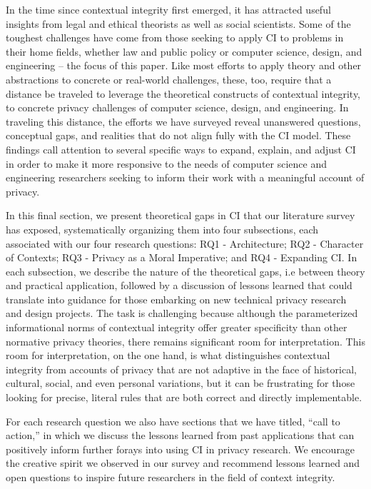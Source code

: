 \documentclass[../thesis.tex]{subfiles}
\begin{document}
In the time since contextual integrity
first emerged, it has attracted useful insights from legal and ethical
theorists as well as social scientists. Some of the toughest challenges
have come from those seeking to apply CI to problems in their home
fields, whether law and public policy or computer science, design, and
engineering -- the focus of this paper. Like most efforts to apply
theory and other abstractions to concrete or real-world challenges,
these, too, require that a distance be traveled to leverage the
theoretical constructs of contextual integrity, to concrete privacy
challenges of computer science, design, and engineering. In traveling
this distance, the efforts we have surveyed reveal unanswered
questions, conceptual gaps, and realities that do not align fully with
the CI model. These findings call attention to several specific ways to
expand, explain, and adjust CI in order to make it more responsive to
the needs of computer science and engineering researchers seeking to
inform their work with a meaningful account of privacy. 

In this final section, we present
theoretical gaps in CI
that our literature survey has exposed,
systematically organizing them into four subsections, each associated
with our four research questions: RQ1 - Architecture; RQ2 - Character
of Contexts; RQ3 - Privacy as a Moral Imperative; and RQ4 - Expanding
CI. In each subsection, we describe the nature of the theoretical gaps,
i.e between theory and practical application, followed by a discussion
of lessons learned that could translate into guidance for those
embarking on new technical privacy research and design projects. The
task is challenging because although the parameterized informational
norms of contextual integrity offer greater specificity than other
normative privacy theories, there remains significant room for
interpretation. This room for interpretation, on the one hand, is what
distinguishes contextual integrity from accounts of privacy that are
not adaptive in the face of historical, cultural, social, and even
personal variations, but it can be frustrating for those looking for
precise, literal rules that are both correct and directly
implementable. 

For each research question we also have
sections that we have titled, ``call to
action,'' in which we discuss the lessons learned
from past applications that can positively inform further forays into
using CI in privacy research. We encourage the creative spirit we
observed in our survey and recommend lessons learned and open questions
to inspire future researchers in the field of context integrity.
\end{document}
